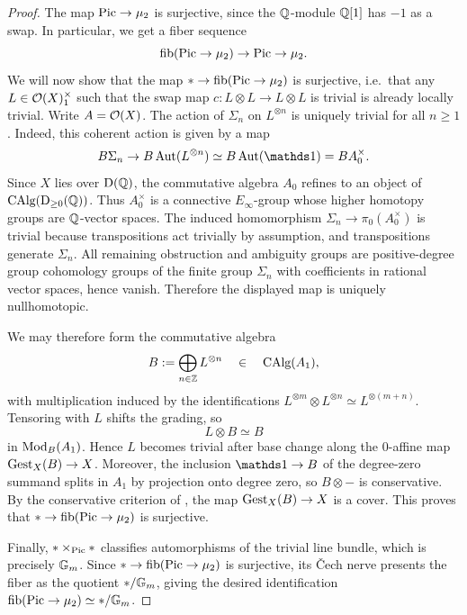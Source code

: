 \documentclass[11pt]{book}
\begin{document}
	\begin{proof}
		The map $\operatorname{Pic} \to \mu_2$ is surjective, since the $\operatorname{\mathbb Q}$-module $\operatorname{\mathbb Q}[1]$ has $-1$ as a swap. In particular, we get a fiber sequence
		\[
			\operatorname{fib}(\operatorname{Pic} \to \mu_2) \to \operatorname{Pic} \to \mu_2.
		\]
		We will now show that the map $* \to \operatorname{fib}(\operatorname{Pic} \to \mu_2)$ is surjective, i.e.\ that any $L \in \mathcal{O}(X)^{\times}_1$ such that the swap map $c\colon L \otimes L \to L \otimes L$ is trivial is already locally trivial. Write $A = \mathcal{O}(X)$. The action of $\Sigma_n$ on $L^{\otimes n}$ is uniquely trivial for all $n \geq 1$. Indeed, this coherent action is given by a map
		\[
			B\Sigma_n \to B\Aut(L^{\otimes n}) \simeq B\Aut(\unit) = B A_0^{\times}.
		\]
		Since $X$ lies over $\operatorname{\mathrm{D}}(\operatorname{\mathbb Q})$, the commutative algebra $A_0$ refines to an object of ${\textup{CAlg}}(\operatorname{\mathrm{D}}_{\geq 0}(\operatorname{\mathbb Q}))$. Thus $A_0^{\times}$ is a connective $E_{\infty}$-group whose higher homotopy groups are $\operatorname{\mathbb Q}$-vector spaces. The induced homomorphism $\Sigma_n \to \pi_0(A_0^{\times})$ is trivial because transpositions act trivially by assumption, and transpositions generate $\Sigma_n$. All remaining obstruction and ambiguity groups are positive-degree group cohomology groups of the finite group $\Sigma_n$ with coefficients in rational vector spaces, hence vanish. Therefore the displayed map is uniquely nullhomotopic.

		We may therefore form the commutative algebra
		\[
			B := \bigoplus_{n \in \operatorname{\mathbb Z}} L^{\otimes n} \quad\in\quad {\textup{CAlg}}(A_1),
		\]
		with multiplication induced by the identifications $L^{\otimes m} \otimes L^{\otimes n} \simeq L^{\otimes(m+n)}$. Tensoring with $L$ shifts the grading, so
		\[
			L \otimes B \simeq B
		\]
		in ${\textup{Mod}}_B(A_1)$. Hence $L$ becomes trivial after base change along the $0$-affine map ${\textup{Gest}}_X(B) \to X$. Moreover, the inclusion $\unit \to B$ of the degree-zero summand splits in $A_1$ by projection onto degree zero, so $B \otimes -$ is conservative. By the conservative criterion of , the map ${\textup{Gest}}_X(B) \to X$ is a cover. This proves that $* \to \operatorname{fib}(\operatorname{Pic} \to \mu_2)$ is surjective.

		Finally, $* \times_{\operatorname{Pic}} *$ classifies automorphisms of the trivial line bundle, which is precisely $\mathbb{G}_m$. Since $* \to \operatorname{fib}(\operatorname{Pic} \to \mu_2)$ is surjective, its \v{C}ech nerve presents the fiber as the quotient $*/\mathbb{G}_m$, giving the desired identification $\operatorname{fib}(\operatorname{Pic} \to \mu_2) \simeq */\mathbb{G}_m$.
	\end{proof}
\end{document}
